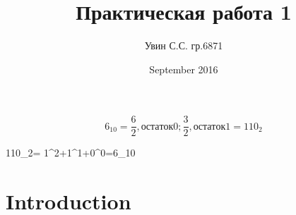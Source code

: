 \documentclass{article}
\title{Практическая работа 1}
\author{Увин С.С. гр.6871 }
\date{September 2016}
\begin{document}
$$6_10= \frac{6}{2}, остаток 0; \frac{3}{2}, остаток 1=110_2$$

$$110_2= 1^2+1^1+0^0=6_10
\maketitle

\section{Introduction}
\end{document}
